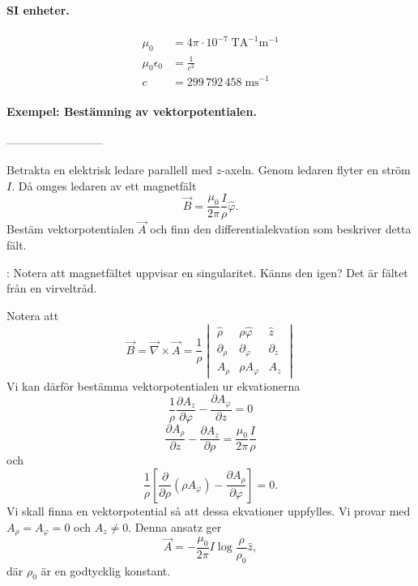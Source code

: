 \documentclass[%
oneside,                 %
final,                   %
10pt]{article}
\newcommand{\shortinlinecomment}[3]{{\color{red}{\bf #1}: #2}}
\begin{document}
\paragraph{SI enheter.}
\begin{align}
\mu_0 &= 4 \pi \cdot 10^{-7} \; \mathrm{T}\mathrm{A}^{-1}\mathrm{m}^{-1} \nonumber \\
\mu_0 \epsilon_0 &= \frac{1}{c^2} \nonumber \\
c &= 299\,792\,458 \; \mathrm{m}\mathrm{s}^{-1} \nonumber
\end{align}

\paragraph{Exempel: Bestämning av vektorpotentialen.}
--------------------------

Betrakta en elektrisk ledare parallell med $z$-axeln.  Genom ledaren flyter en ström $I$.  Då omges ledaren av ett magnetfält
$$
\vec{B} = \frac{\mu_0}{2\pi}\frac{I}{\rho}{\hat \varphi}.
$$
Bestäm vektorpotentialen $\vec{A}$ och finn den differentialekvation som beskriver detta fält.

\shortinlinecomment{Comment 1}{ Notera att magnetfältet uppvisar en singularitet. Känns den igen? Det är fältet från en virveltråd. }{ Notera att magnetfältet uppvisar }

Notera att
$$
\vec{B} = \vec{\nabla} \times \vec{A} = \frac{1}{\rho}
\begin{vmatrix}
\hat{\rho} & \rho \hat{\varphi} & \hat{z} \\
\partial_\rho & \partial_\varphi & \partial_z \\
A_\rho & {\rho A_\varphi} & A_z
\end{vmatrix} 
$$
Vi kan därför bestämma vektorpotentialen ur ekvationerna
\begin{equation}
  \frac{1}{\rho}\frac{\partial A_z}{\partial \varphi} - \frac{\partial A_\varphi}
{\partial z} = 0
\label{rho}
\end{equation}
\begin{equation}
  \frac{\partial A_\rho}{\partial z} - \frac{\partial A_z}{\partial \rho} =
\frac{\mu_0}{2\pi}\frac{I}{\rho}
\label{phi}
\end{equation}
och
\begin{equation}
  \frac{1}{\rho}\left[\frac{\partial}{\partial \rho} \left(\rho A_\varphi\right)
- \frac{\partial A_\rho}{\partial \varphi}\right] = 0.
\label{z}
\end{equation}
Vi skall finna en vektorpotential så att dessa ekvationer uppfylles. Vi provar med $A_\rho = A_\varphi=0$ och $A_z \neq 0$. Denna ansatz ger
\begin{equation}
  \vec{A} = - \frac{\mu_0}{2\pi} I \log\frac{\rho}{\rho_0} { \hat z},
\end{equation}
där $\rho_0$ är en godtycklig konstant.
\end{document}
